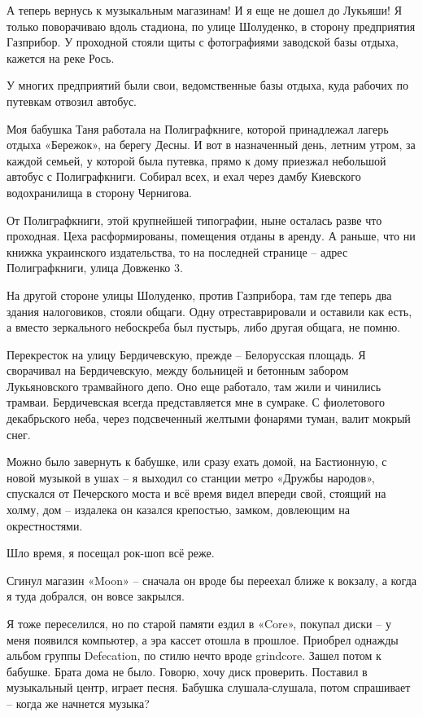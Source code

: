 А теперь вернусь к музыкальным магазинам! И я еще не дошел до Лукьяши! Я только поворачиваю вдоль стадиона, по улице Шолуденко, в сторону предприятия Газприбор. У проходной стояли щиты с фотографиями заводской базы отдыха, кажется на реке Рось.

У многих предприятий были свои, ведомственные базы отдыха, куда рабочих по путевкам отвозил автобус. 

Моя бабушка Таня работала на Полиграфкниге, которой принадлежал лагерь отдыха «Бережок», на берегу Десны. И вот в назначенный день, летним утром, за каждой семьей, у которой была путевка, прямо к дому приезжал небольшой автобус с Полиграфкниги. Собирал всех, и ехал через дамбу Киевского водохранилища в сторону Чернигова. 

От Полиграфкниги, этой крупнейшей типографии, ныне осталась разве что проходная. Цеха  расформированы, помещения отданы в аренду. А раньше, что ни книжка украинского издательства, то на последней странице – адрес Полиграфкниги, улица Довженко 3.

На другой стороне улицы Шолуденко, против Газприбора, там где теперь два здания налоговиков, стояли общаги. Одну отреставрировали и оставили как есть, а вместо зеркального небоскреба был пустырь, либо другая общага, не помню.

Перекресток на улицу Бердичевскую, прежде – Белорусская площадь. Я сворачивал на Бердичевскую, между больницей и бетонным забором Лукьяновского трамвайного депо. Оно еще работало, там жили и чинились трамваи. Бердичевская всегда представляется мне в сумраке. С фиолетового декабрьского неба, через подсвеченный желтыми фонарями туман, валит мокрый снег.

Можно было завернуть к бабушке, или сразу ехать домой, на Бастионную, с новой музыкой в ушах – я выходил со станции метро «Дружбы народов», спускался от Печерского моста и всё время видел впереди свой, стоящий на холму, дом – издалека он казался крепостью, замком, довлеющим на окрестностями.

Шло время, я посещал рок-шоп всё реже. 

Сгинул магазин «Moon» – сначала он вроде бы переехал ближе к вокзалу, а когда я туда добрался, он вовсе закрылся. 

Я тоже переселился, но по старой памяти ездил в «Core», покупал диски – у меня появился компьютер, а эра кассет отошла в прошлое. Приобрел однажды альбом группы Defecation, по стилю нечто вроде grindcore. Зашел потом к бабушке. Брата дома не было. Говорю, хочу диск проверить. Поставил в музыкальный центр, играет песня. Бабушка слушала-слушала, потом спрашивает – когда же начнется музыка?
  
